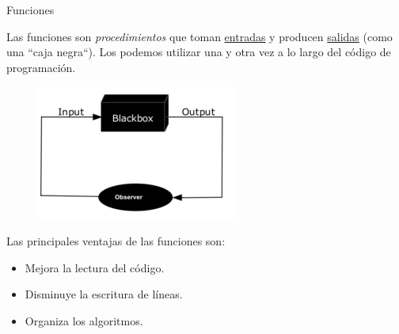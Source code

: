 \begin{frame}[t]{Funciones}\vspace{0pt}

Las funciones son \textit{procedimientos} que toman \underline{entradas} y producen \underline{salidas} (como una ``caja negra``). Los podemos utilizar una y otra vez a lo largo del código de programación.  

\begin{figure}
	\includegraphics[scale=0.65]{Images/BlackBox.png}
\end{figure}

Las principales ventajas de las funciones son:

\begin{itemize}
	\item Mejora la lectura del código.
	\item Disminuye la escritura de líneas.
	\item Organiza los algoritmos.
\end{itemize}

\end{frame}